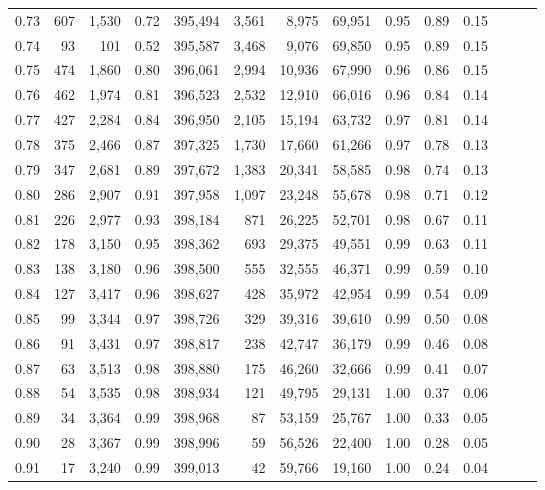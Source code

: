 \begin{tabular}{rrrrrrrrrrrrrr}
0.73 &    607 &  1,530 &  0.72 &  395,494 &    3,561 &   8,975 &  69,951 &  0.95 &  0.89 &      0.15 \\
0.74 &     93 &    101 &  0.52 &  395,587 &    3,468 &   9,076 &  69,850 &  0.95 &  0.89 &      0.15 \\
0.75 &    474 &  1,860 &  0.80 &  396,061 &    2,994 &  10,936 &  67,990 &  0.96 &  0.86 &      0.15 \\
0.76 &    462 &  1,974 &  0.81 &  396,523 &    2,532 &  12,910 &  66,016 &  0.96 &  0.84 &      0.14 \\
0.77 &    427 &  2,284 &  0.84 &  396,950 &    2,105 &  15,194 &  63,732 &  0.97 &  0.81 &      0.14 \\
0.78 &    375 &  2,466 &  0.87 &  397,325 &    1,730 &  17,660 &  61,266 &  0.97 &  0.78 &      0.13 \\
0.79 &    347 &  2,681 &  0.89 &  397,672 &    1,383 &  20,341 &  58,585 &  0.98 &  0.74 &      0.13 \\
0.80 &    286 &  2,907 &  0.91 &  397,958 &    1,097 &  23,248 &  55,678 &  0.98 &  0.71 &      0.12 \\
0.81 &    226 &  2,977 &  0.93 &  398,184 &      871 &  26,225 &  52,701 &  0.98 &  0.67 &      0.11 \\
0.82 &    178 &  3,150 &  0.95 &  398,362 &      693 &  29,375 &  49,551 &  0.99 &  0.63 &      0.11 \\
0.83 &    138 &  3,180 &  0.96 &  398,500 &      555 &  32,555 &  46,371 &  0.99 &  0.59 &      0.10 \\
0.84 &    127 &  3,417 &  0.96 &  398,627 &      428 &  35,972 &  42,954 &  0.99 &  0.54 &      0.09 \\
0.85 &     99 &  3,344 &  0.97 &  398,726 &      329 &  39,316 &  39,610 &  0.99 &  0.50 &      0.08 \\
0.86 &     91 &  3,431 &  0.97 &  398,817 &      238 &  42,747 &  36,179 &  0.99 &  0.46 &      0.08 \\
0.87 &     63 &  3,513 &  0.98 &  398,880 &      175 &  46,260 &  32,666 &  0.99 &  0.41 &      0.07 \\
0.88 &     54 &  3,535 &  0.98 &  398,934 &      121 &  49,795 &  29,131 &  1.00 &  0.37 &      0.06 \\
0.89 &     34 &  3,364 &  0.99 &  398,968 &       87 &  53,159 &  25,767 &  1.00 &  0.33 &      0.05 \\
0.90 &     28 &  3,367 &  0.99 &  398,996 &       59 &  56,526 &  22,400 &  1.00 &  0.28 &      0.05 \\
0.91 &     17 &  3,240 &  0.99 &  399,013 &       42 &  59,766 &  19,160 &  1.00 &  0.24 &      0.04 \\

\end{tabular}
